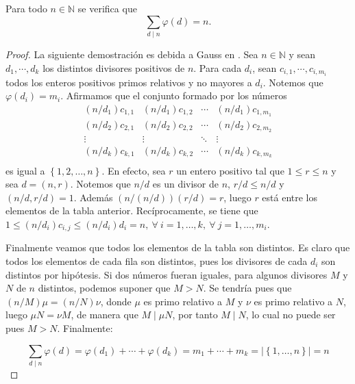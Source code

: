 \begin{theorem}[Gauss]\label{thm:gauss}
Para todo $n\in\mathbb{N}$ se verifica que 
\begin{equation*}
	\sum_{d \mid n} \varphi(d)=n.
\end{equation*}
\end{theorem}
\begin{proof}
La siguiente demostración es debida a Gauss en \cite{Gauss1}. Sea $n\in\mathbb{N}$ y sean $d_1,\cdots,d_k$ los distintos divisores positivos de $n$. Para cada $d_i$, sean $c_{i,1},\cdots,c_{i,m_i}$ todos los enteros positivos primos relativos y no mayores a $d_i$. Notemos que $\varphi(d_i)=m_i$. Afirmamos que el conjunto formado por los números 
\begin{equation*}
	\renewcommand\arraystretch{2}
	\begin{matrix}
	(n/d_1)c_{1,1} & (n/d_1)c_{1,2} & \cdots & (n/d_1)c_{1,m_1} \\
	(n/d_2)c_{2,1} & (n/d_2)c_{2,2} & \cdots & (n/d_2)c_{2,m_2} \\
	\vdots & \vdots & \ddots & \vdots \\
	(n/d_k)c_{k,1} & (n/d_k)c_{k,2} & \cdots & (n/d_k)c_{k,m_k} \\
	\end{matrix}
\end{equation*}
es igual a $\left\{1,2,\ldots,n\right\}$. En efecto, sea $r$ un entero positivo tal que $1\leq r\leq n$  y sea $d=(n,r)$. Notemos que $n/d$ es un divisor de $n$, $r/d\leq n/d$ y $(n/d,r/d)=1$. Además $(n/(n/d))(r/d)=r$, luego $r$ está entre los elementos de la tabla anterior. Recíprocamente, se tiene que $1\leq (n/d_i)c_{i,j}\leq (n/d_i)d_i=n,\:\forall \: i=1,\ldots,k,\:\forall \: j=1,\ldots,m_i$.
\medskip

Finalmente veamos que todos los elementos de la tabla son distintos. Es claro que todos los elementos de cada fila son distintos, pues los divisores de cada $d_i$ son distintos por hipótesis. Si dos números fueran iguales, para algunos divisores $M$ y $N$ de $n$ distintos, podemos suponer que $M>N$. Se tendría pues que $(n/M)\mu=(n/N)\nu$, donde $\mu$ es primo relativo a $M$ y $\nu$ es primo relativo a $N$, luego $\mu N=\nu M$, de manera que $M \mid \mu N$, por tanto $M \mid N$, lo cual no puede ser pues $M>N$. Finalmente: 

\begin{equation*}
	\sum_{d \mid n} \varphi(d) = \varphi(d_1)+\cdots+\varphi(d_k) = m_1+\cdots+m_k = |\left\{1,\ldots,n\right\}| = n
\end{equation*}
\end{proof}

